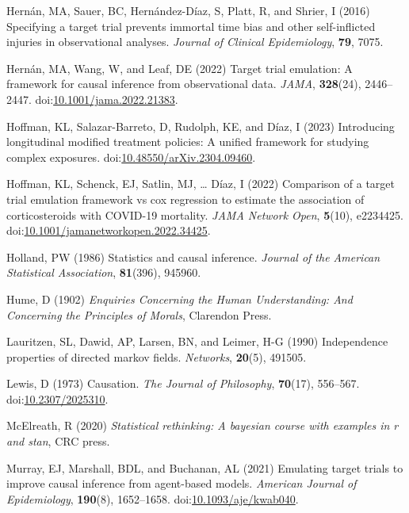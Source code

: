 \documentclass[
  singlecolumn,
  9pt]{article}
\newlength{\cslhangindent}
\newenvironment{CSLReferences}[2] %
 {\begin{list}{}{%
  \setlength{\itemindent}{0pt}
  \setlength{\leftmargin}{0pt}
  \setlength{\parsep}{0pt}
  \ifodd #1
   \setlength{\leftmargin}{\cslhangindent}
   \setlength{\itemindent}{-1\cslhangindent}
  \fi
  \setlength{\itemsep}{#2\baselineskip}}}
 {\end{list}}
\begin{document}
\begin{CSLReferences}{1}{0}
Hernán, MA, Sauer, BC, Hernández-Díaz, S, Platt, R, and Shrier, I (2016)
Specifying a target trial prevents immortal time bias and other
self-inflicted injuries in observational analyses. \emph{Journal of
Clinical Epidemiology}, \textbf{79}, 7075.

Hernán, MA, Wang, W, and Leaf, DE (2022) Target trial emulation: A
framework for causal inference from observational data. \emph{JAMA},
\textbf{328}(24), 2446--2447.
doi:\href{https://doi.org/10.1001/jama.2022.21383}{10.1001/jama.2022.21383}.

Hoffman, KL, Salazar-Barreto, D, Rudolph, KE, and Díaz, I (2023)
Introducing longitudinal modified treatment policies: A unified
framework for studying complex exposures.
doi:\href{https://doi.org/10.48550/arXiv.2304.09460}{10.48550/arXiv.2304.09460}.

Hoffman, KL, Schenck, EJ, Satlin, MJ, \ldots{} Díaz, I (2022) Comparison
of a target trial emulation framework vs cox regression to estimate the
association of corticosteroids with COVID-19 mortality. \emph{JAMA
Network Open}, \textbf{5}(10), e2234425.
doi:\href{https://doi.org/10.1001/jamanetworkopen.2022.34425}{10.1001/jamanetworkopen.2022.34425}.

Holland, PW (1986) Statistics and causal inference. \emph{Journal of the
American Statistical Association}, \textbf{81}(396), 945960.

Hume, D (1902) \emph{Enquiries Concerning the Human Understanding: And
Concerning the Principles of Morals}, Clarendon Press.

Lauritzen, SL, Dawid, AP, Larsen, BN, and Leimer, H-G (1990)
Independence properties of directed markov fields. \emph{Networks},
\textbf{20}(5), 491505.

Lewis, D (1973) Causation. \emph{The Journal of Philosophy},
\textbf{70}(17), 556--567.
doi:\href{https://doi.org/10.2307/2025310}{10.2307/2025310}.

McElreath, R (2020) \emph{Statistical rethinking: A bayesian course with
examples in r and stan}, CRC press.

Murray, EJ, Marshall, BDL, and Buchanan, AL (2021) Emulating target
trials to improve causal inference from agent-based models.
\emph{American Journal of Epidemiology}, \textbf{190}(8), 1652--1658.
doi:\href{https://doi.org/10.1093/aje/kwab040}{10.1093/aje/kwab040}.


\end{CSLReferences}
\end{document}

